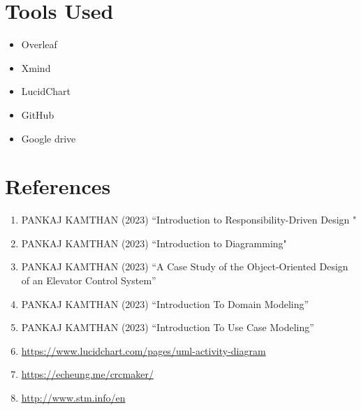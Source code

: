 \documentclass[a4paper, 11pt]{report}
\begin{document}
\chapter{Tools Used}
 \begin{itemize}
     \item Overleaf
     \item Xmind
     \item LucidChart
     \item GitHub
     \item Google drive
 \end{itemize}
\chapter{References}
\begin{enumerate}
  \item PANKAJ KAMTHAN (2023) “Introduction to Responsibility-Driven Design "
  \item PANKAJ KAMTHAN (2023) “Introduction to Diagramming"
  \item PANKAJ KAMTHAN (2023) “A Case Study of the Object-Oriented Design of an Elevator Control System”
  \item PANKAJ KAMTHAN (2023) “Introduction To Domain Modeling”
  \item PANKAJ KAMTHAN (2023) “Introduction To Use Case Modeling” 
  \item \url{https://www.lucidchart.com/pages/uml-activity-diagram}
  \item \url{https://echeung.me/crcmaker/}
  \item \url{http://www.stm.info/en}
\end{enumerate}
\end{document}
